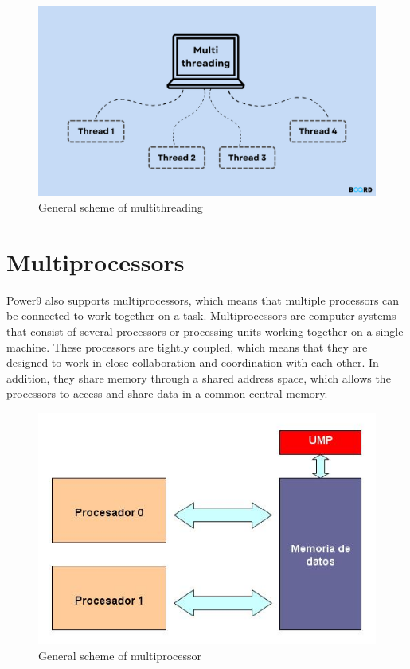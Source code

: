 \documentclass{report}
\begin{document}
\begin{figure}[H]
  \centering
  \includegraphics[scale=0.3]{img/multithreading.png}
  \caption{General scheme of multithreading}
  \label{fig:General scheme of multithreading}
\end{figure}

\cleardoublepage

\section{Multiprocessors}
Power9 also supports multiprocessors, which means that multiple processors can be connected to work together on a task. Multiprocessors 
are computer systems that consist of several processors or processing units working together on a single machine. These processors are
tightly coupled, which means that they are designed to work in close collaboration and coordination with each other. In addition,
they share memory through a shared address space, which allows the processors to access and share data in a common central memory.

\begin{figure}[H]
  \centering
  \includegraphics[scale=0.5]{img/multiprocesador.jpg}
  \caption{General scheme of multiprocessor}
  \label{fig:General scheme of multiprocessor}
\end{figure}
\end{document}
